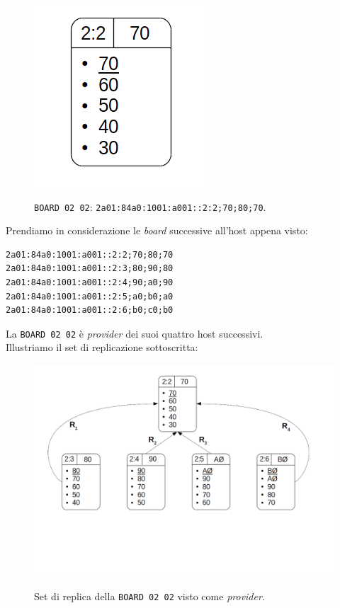 \begin{figure}[htbp]
\centering
\includegraphics[scale=0.20]{img/focus_provider.png}\\
\caption{\verb"BOARD 02 02": \verb"2a01:84a0:1001:a001::2:2;70;80;70". \label{figura1.16}}
\end{figure}

Prendiamo in considerazione le \textit{board} successive all'host appena visto:

\begin{verbatim}
2a01:84a0:1001:a001::2:2;70;80;70
2a01:84a0:1001:a001::2:3;80;90;80
2a01:84a0:1001:a001::2:4;90;a0;90
2a01:84a0:1001:a001::2:5;a0;b0;a0
2a01:84a0:1001:a001::2:6;b0;c0;b0
\end{verbatim}

La \verb"BOARD 02 02" \`{e} \textit{provider} dei suoi quattro host successivi. \\
Illustriamo il set di replicazione sottoscritta:

\begin{figure}[htbp]
\centering
\includegraphics[scale=0.40]{img/prov_replica.png}\\
\caption{Set di replica della \verb"BOARD 02 02" visto come \textit{provider}. \label{figura1.17}}
\end{figure}

